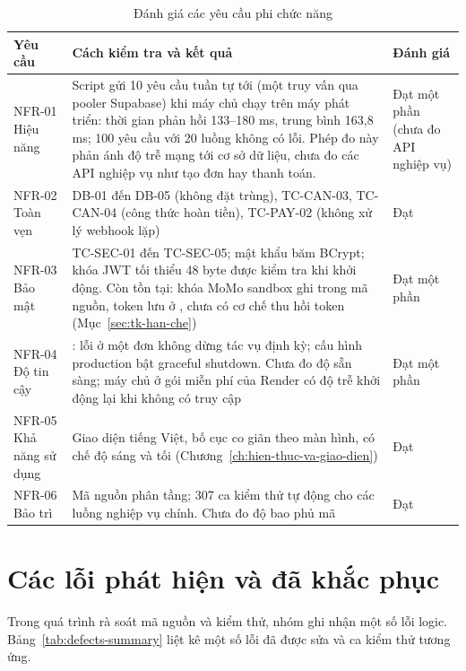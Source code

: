 \begin{table}[!htbp]
\centering
\caption{Đánh giá các yêu cầu phi chức năng}
\label{tab:nfr-verification}
\footnotesize
\renewcommand{\arraystretch}{1.15}
\begin{tabularx}{\linewidth}{|P{1.6cm}|L|P{2.3cm}|}
\hline
\textbf{Yêu cầu} & \textbf{Cách kiểm tra và kết quả} & \textbf{Đánh giá} \\
\hline
NFR-01 Hiệu năng & Script  gửi 10 yêu cầu tuần tự tới  (một truy vấn  qua pooler Supabase) khi máy chủ chạy trên máy phát triển: thời gian phản hồi 133--180 ms, trung bình 163,8 ms; 100 yêu cầu với 20 luồng không có lỗi. Phép đo này phản ánh độ trễ mạng tới cơ sở dữ liệu, chưa đo các API nghiệp vụ như tạo đơn hay thanh toán. & Đạt một phần (chưa đo API nghiệp vụ) \\
\hline
NFR-02 Toàn vẹn & DB-01 đến DB-05 (không đặt trùng), TC-CAN-03, TC-CAN-04 (công thức hoàn tiền), TC-PAY-02 (không xử lý webhook lặp) & Đạt \\
\hline
NFR-03 Bảo mật & TC-SEC-01 đến TC-SEC-05; mật khẩu băm BCrypt; khóa JWT tối thiểu 48 byte được kiểm tra khi khởi động. Còn tồn tại: khóa MoMo sandbox ghi trong mã nguồn, token lưu ở , chưa có cơ chế thu hồi token (Mục~\ref{sec:tk-han-che}) & Đạt một phần \\
\hline
NFR-04 Độ tin cậy & : lỗi ở một đơn không dừng tác vụ định kỳ; cấu hình production bật graceful shutdown. Chưa đo độ sẵn sàng; máy chủ ở gói miễn phí của Render có độ trễ khởi động lại khi không có truy cập & Đạt một phần \\
\hline
NFR-05 Khả năng sử dụng & Giao diện tiếng Việt, bố cục co giãn theo màn hình, có chế độ sáng và tối (Chương~\ref{ch:hien-thuc-va-giao-dien}) & Đạt \\
\hline
NFR-06 Bảo trì & Mã nguồn phân tầng; 307 ca kiểm thử tự động cho các luồng nghiệp vụ chính. Chưa đo độ bao phủ mã & Đạt \\
\hline
\end{tabularx}
\end{table}

\section{Các lỗi phát hiện và đã khắc phục}
\label{sec:kt-defects}

Trong quá trình rà soát mã nguồn và kiểm thử, nhóm ghi nhận một số lỗi logic. Bảng~\ref{tab:defects-summary} liệt kê một số lỗi đã được sửa và ca kiểm thử tương ứng.

